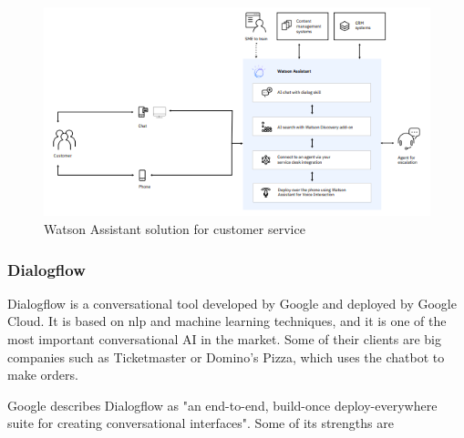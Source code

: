 \begin{figure}[ht]
\includegraphics[scale=0.8]{docs/img/project_pics/watson_customer.png}
\centering
\caption{Watson Assistant solution for customer service \cite{watson_diagram}}
\end{figure}


\subsubsection{Dialogflow}
Dialogflow is a conversational tool developed by Google and deployed by Google Cloud. It is based on \acl{nlp} and machine learning techniques, and it is one of the most important conversational AI in the market. Some of their clients are big companies such as Ticketmaster or Domino's Pizza, which uses the chatbot to make orders\cite{dominos}.

Google describes Dialogflow as "an end-to-end, build-once deploy-everywhere suite for creating conversational interfaces"\cite{dialogflow_overview}. Some of its strengths are 

